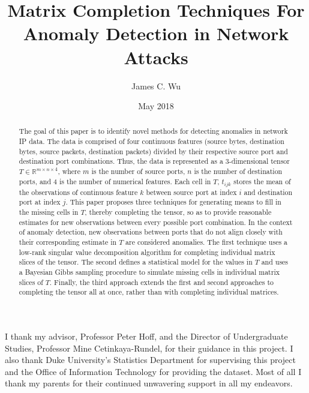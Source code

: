\documentclass[12pt,twoside]{dukestatscithesis}
\title{Matrix Completion Techniques For Anomaly Detection in Network Attacks}
\author{James C. Wu}
\date{May 2018}
\theoremstyle{definition}
\theoremstyle{definition}
\theoremstyle{definition}
\theoremstyle{remark}
\begin{document}
  \maketitle

\frontmatter %
\pagestyle{empty} %
  \begin{acknowledgements}
    I thank my advisor, Professor Peter Hoff, and the Director of
    Undergraduate Studies, Professor Mine Cetinkaya-Rundel, for their
    guidance in this project. I also thank Duke University's Statistics
    Department for supervising this project and the Office of Information
    Technology for providing the dataset. Most of all I thank my parents for
    their continued unwavering support in all my endeavors.
  \end{acknowledgements}

  \hypersetup{linkcolor=black}
  \setcounter{tocdepth}{2}
  \tableofcontents


  \begin{abstract}
    The goal of this paper is to identify novel methods for detecting
    anomalies in network IP data. The data is comprised of four continuous
    features (source bytes, destination bytes, source packets, destination
    packets) divided by their respective source port and destination port
    combinations. Thus, the data is represented as a 3-dimensional tensor
    \(T \in \mathbb{R}^{m \times n \times 4}\), where \(m\) is the number of
    source ports, \(n\) is the number of destination ports, and \(4\) is the
    number of numerical features. Each cell in \(T\), \(t_{ijk}\) stores the
    mean of the observations of continuous feature \(k\) between source port
    at index \(i\) and destination port at index \(j\). This paper proposes
    three techniques for generating means to fill in the missing cells in
    \(T\), thereby completing the tensor, so as to provide reasonable
    estimates for new observations between every possible port combination.
    In the context of anomaly detection, new observations between ports that
    do not align closely with their corresponding estimate in \(T\) are
    considered anomalies. The first technique uses a low-rank singular value
    decomposition algorithm for completing individual matrix slices of the
    tensor. The second defines a statistical model for the values in \(T\)
    and uses a Bayesian Gibbs sampling procedure to simulate missing cells
    in individual matrix slices of \(T\). Finally, the third approach
    extends the first and second approaches to completing the tensor all at
    once, rather than with completing individual matrices.
  \end{abstract}
\end{document}
